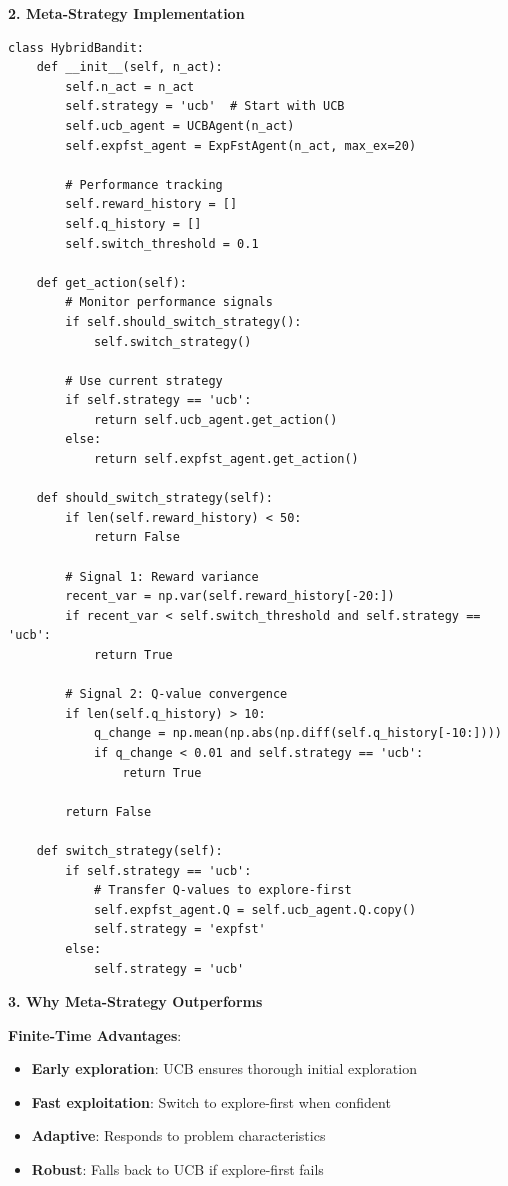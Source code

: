 \documentclass[12pt]{article}
\begin{document}
{{{\textbf{2. Meta-Strategy Implementation}

\begin{verbatim}
class HybridBandit:
    def __init__(self, n_act):
        self.n_act = n_act
        self.strategy = 'ucb'  # Start with UCB
        self.ucb_agent = UCBAgent(n_act)
        self.expfst_agent = ExpFstAgent(n_act, max_ex=20)
        
        # Performance tracking
        self.reward_history = []
        self.q_history = []
        self.switch_threshold = 0.1
        
    def get_action(self):
        # Monitor performance signals
        if self.should_switch_strategy():
            self.switch_strategy()
            
        # Use current strategy
        if self.strategy == 'ucb':
            return self.ucb_agent.get_action()
        else:
            return self.expfst_agent.get_action()
            
    def should_switch_strategy(self):
        if len(self.reward_history) < 50:
            return False
            
        # Signal 1: Reward variance
        recent_var = np.var(self.reward_history[-20:])
        if recent_var < self.switch_threshold and self.strategy == 'ucb':
            return True
            
        # Signal 2: Q-value convergence
        if len(self.q_history) > 10:
            q_change = np.mean(np.abs(np.diff(self.q_history[-10:])))
            if q_change < 0.01 and self.strategy == 'ucb':
                return True
                
        return False
        
    def switch_strategy(self):
        if self.strategy == 'ucb':
            # Transfer Q-values to explore-first
            self.expfst_agent.Q = self.ucb_agent.Q.copy()
            self.strategy = 'expfst'
        else:
            self.strategy = 'ucb'
\end{verbatim}

\textbf{3. Why Meta-Strategy Outperforms}

\textbf{Finite-Time Advantages}:
\begin{itemize}
\item \textbf{Early exploration}: UCB ensures thorough initial exploration
\item \textbf{Fast exploitation}: Switch to explore-first when confident
\item \textbf{Adaptive}: Responds to problem characteristics
\item \textbf{Robust}: Falls back to UCB if explore-first fails
\end{itemize}

}}}
\end{document}
